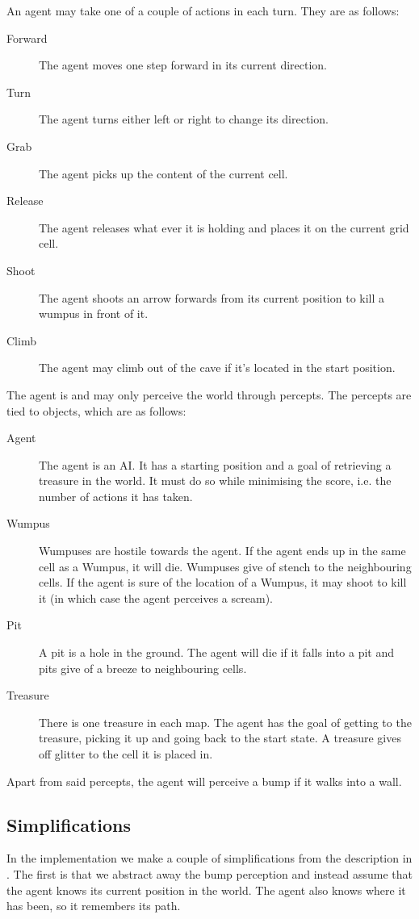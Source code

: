 An agent may take one of a couple of actions in each turn. They are as follows:
\begin{description}
    \item[Forward] The agent moves one step forward in its current direction.
    \item[Turn] The agent turns either left or right to change its direction.
    \item[Grab] The agent picks up the content of the current cell.
    \item[Release] The agent releases what ever it is holding and places it on the current grid cell.
    \item[Shoot] The agent shoots an arrow forwards from its current position to kill a wumpus in front of it.
    \item[Climb] The agent may climb out of the cave if it's located in the start position.
\end{description}

The agent is  and may only perceive the world through percepts. The percepts are tied to objects, which are as follows:
\begin{description}
    \item[Agent] The agent is an \ac{AI}. It has a starting position and a goal of retrieving a treasure in the world. It must do so while minimising the score, i.e. the number of actions it has taken.
    \item[Wumpus] Wumpuses are hostile towards the agent. If the agent ends up in the same cell as a Wumpus, it will die. Wumpuses give of stench to the neighbouring cells. If the agent is sure of the location of a Wumpus, it may shoot to kill it (in which case the agent perceives a scream).
    \item[Pit] A pit is a hole in the ground. The agent will die if it falls into a pit and pits give of a breeze to neighbouring cells.
    \item[Treasure] There is one treasure in each map. The agent has the goal of getting to the treasure, picking it up and going back to the start state. A treasure gives off glitter to the cell it is placed in.
\end{description}
Apart from said percepts, the agent will perceive a bump if it walks into a wall.

\subsection{Simplifications}
In the implementation we make a couple of simplifications from the description in \cite{wumpus:world}. The first is that we abstract away the bump perception and instead assume that the agent knows its current position in the world.
The agent also knows where it has been, so it remembers its path.

